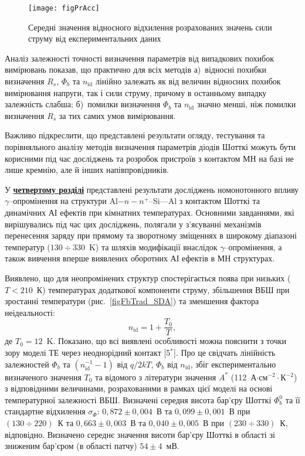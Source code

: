 \begin{figure}
\center
\texttt{[image: figPrAcc]}%
\caption{\label{figPrAcc}
Середні значення відносного відхилення розрахованих значень сили струму від експериментальних даних
}
\end{figure}


Аналіз залежності точності визначення параметрів від випадкових похибок вимірювань показав, що практично для всіх методів
а)~відносні похибки визначення $R_s$, $\Phi_b$ та $n_\mathrm{id}$ лінійно залежать як від величин відносних похибок вимірювання напруги, так і сили струму, причому в останньому випадку залежність слабша;
б)~помилки визначення $\Phi_b$ та $n_\mathrm{id}$ значно менші, ніж помилки визначення $R_s$ за тих самих умов вимірювання.

Важливо підкреслити, що представлені результати огляду, тестування та порівняльного аналізу методів визначення параметрів діодів Шотткі можуть бути корисними під час досліджень та розробок пристроїв з контактом МН на базі не лише кремнію, але й інших напівпровідників.


У  \underline{\textbf{четвертому розділі}} представлені результати досліджень
номонотонного впливу $\gamma$--опромінення на структури Al$-n-n^+$--Si---Al з контактом Шотткі та
динамічних АІ ефектів при кімнатних температурах.
Основними завданнями, які вирішувались під час цих досліджень, полягали у з'ясуванні механізмів перенесення заряду при прямому та
    зворотному зміщеннях в широкому діапазоні температур ($130\div330$~K) та шляхів модифікації внаслідок $\gamma$--опромінення, а також вивчення вперше виявлених
    оборотних АІ ефектів в МН структурах.

Виявлено, що для неопромінених структур спостерігається поява при низьких ($T<210$~К) температурах додаткової компоненти струму,
збільшення ВБШ при зростанні температури (рис.~\ref{figFbTrad_SDA}) та зменшення фактора неідеальності:
\begin{equation}\label{eqN_T:TE}
n_{\mathrm{id}}=1+\frac{T_0}{T},
\end{equation}
де $T_0=12$~K.
Показано, що всі виявлені особливості можна пояснити з точки зору моделі ТЕ через неоднорідний контакт
[5$^*$].
Про це свідчать лінійність залежностей $\Phi_{b}$ та $(n_{\mathrm{id}}^{-1}-1)$ від $q/2kT$, $\Phi_{b}$ від $n_{\mathrm{id}}$,
збіг експериментально визначеного значення $T_0$  та відомого з літератури значення $A^*$ (112~А$\cdot$см$^{-2}\cdot$К$^{-2}$) з відповідними величинами,
розрахованими в рамках цієї моделі на основі температурної залежності ВБШ.
       Визначені середня висота бар'єру Шотткі $\Phi_b^0$ та її стандартне відхилення $\sigma_{\Phi}$:
       $0,872\pm0,004$~В та $0,099\pm0,001$~В при $(130\div220)$~К та
       $0,663\pm0,003$~В та $0,040\pm0,005$~В при $(230\div330)$~К, відповідно.
Визначено середнє значення висоти бар'єру Шотткі в області зі зниженим бар'єром (в області патчу) $54\pm4$~мВ.

